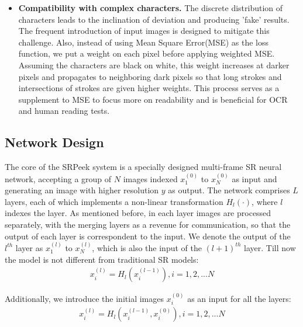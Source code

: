 \begin{itemize}
    \item \textbf{Compatibility with complex characters.} The discrete distribution of characters leads to the inclination of deviation and producing 'fake' results. The frequent introduction of input images is designed to mitigate this challenge. Also, instead of using Mean Square Error(MSE) as the loss function, we put a weight on each pixel before applying weighted MSE. Assuming the characters are black on white, this weight increases at darker pixels and propagates to neighboring dark pixels so that long strokes and intersections of strokes are given higher weights. This process serves as a supplement to MSE to focus more on readability and is beneficial for OCR and human reading tests. 
  \end{itemize}

\subsection{Network Design}
The core of the \textsf{SRPeek} system is a specially designed multi-frame SR neural network, accepting a group of $N$ images indexed $x_1^{(0)}$ to $x_N^{(0)}$ as input and generating an image with higher resolution $y$ as output. The network comprises $L$ layers, each of which implements a non-linear transformation $H_l(\cdot)$, where $l$ indexes the layer. As mentioned before, in each layer images are processed separately, with the merging layers as a revenue for communication, so that the output of each layer is correspondent to the input.  We denote the output of the $l^{th}$ layer as $x_1^{(l)}$ to $x_N^{(l)}$, which is also the input of the $(l+1)^{th}$ layer. Till now the model is not different from traditional SR models:
\begin{equation}\label{eq:1}
    \begin{split}
x_i^{(l)} = H_l(x_i^{(l-1)}), i=1,2,...N
\end{split}
\end{equation}


Additionally, we introduce the initial images $x_i^{(0)}$ as an input for all the layers:
\begin{equation}\label{eq:2}
    \begin{split}
        x_i^{(l)} = H_l(x_i^{(l-1)},x_i^{(0)}), i=1,2,...N
\end{split}
\end{equation}

